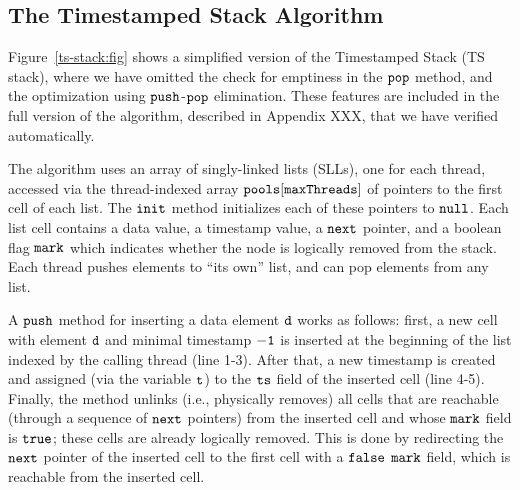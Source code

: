 \subsection{The Timestamped Stack Algorithm}





Figure~\ref{ts-stack:fig} shows a simplified version of the Timestamped Stack (TS stack), where we have omitted the check for emptiness in the ${\tt pop}$ method, and the optimization using ${\tt push}$-${\tt pop}$ elimination. These features are included in the full version of the algorithm, described in Appendix XXX, that we have verified automatically.

The algorithm uses an array of singly-linked lists (SLLs), one for each thread, accessed via the thread-indexed array ${\tt pools[maxThreads]}$ of pointers to the first cell of each list. The ${\tt init}$ method initializes each of these pointers to ${\tt null}$. Each list cell contains a data value, a timestamp value, a ${\tt next}$ pointer, and a boolean flag ${\tt mark}$ which indicates whether the node is logically removed from the stack. Each thread pushes elements to ``its own'' list, and can pop elements from any list.

A ${\tt push}$ method for inserting a data element ${\tt d}$ works as follows: first, a new cell with element ${\tt d}$ and minimal timestamp ${\tt -1}$ is inserted at the beginning of the list indexed by the calling thread (line 1-3). After that, a new timestamp is created and assigned (via the variable ${\tt t}$) to the ${\tt ts}$ field of the inserted cell (line 4-5).
Finally, the method unlinks (i.e., physically removes) all cells that are reachable (through a sequence of $\tt next$ pointers) from the inserted cell and whose ${\tt mark}$ field is ${\tt true}$; these cells are already logically removed. This is done by redirecting the $\tt next$ pointer of the inserted cell to the first cell with a ${\tt false}$ $\tt mark$ field, which is
reachable from the inserted cell.

